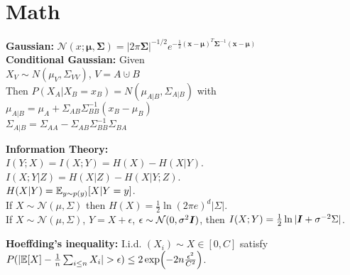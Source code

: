 \section{Math}\vspace*{-0.8em}
\textbf{Gaussian:}
$\mathcal{N}(x;\bm{\mu}, \bm{\Sigma})= |2\pi\bm{\Sigma}|^{-1/2} e^{-\frac{1}{2}(\mathbf{x}-\bm{\mu})^T\bm{\Sigma}^{-1}(\mathbf{x}-\bm{\mu})} $\\
\textbf{Conditional Gaussian:}
Given\\$X_V \sim N(\mu_V, \Sigma_{VV})$, $V=A\cupdot B$\\
Then $P(X_A|X_B=x_B)=N(\mu_{A|B}, \Sigma_{A|B})$ with\\
$\mu_{A|B}=\mu_A+\Sigma_{AB}\Sigma^{-1}_{BB}(x_B-\mu_B)$\\
$\Sigma_{A|B}=\Sigma_{AA}-\Sigma_{AB}\Sigma^{-1}_{BB}\Sigma_{BA}$

\textbf{Information Theory:}\\
$I(Y;X) = I(X;Y) = H(X) - H(X|Y)$.\\
$I(X;Y|Z) = H(X|Z) - H(X|Y;Z)$.\\
$H(X|Y) = \mathbb{E}_{y\sim p(y)}[X|Y=y]$.\\
If $X\sim\mathcal{N}(\mu, \Sigma)$ then $H(X) = \frac{1}{2}\ln(2\pi e)^d|\Sigma|$.\\
If $X\sim\mathcal{N}(\mu, \Sigma)$, $Y = X + \epsilon$, $\epsilon\sim\mathcal{N}(0,\sigma^2{\bm{I}})$, then $I(X;Y) = \frac{1}{2}\ln|{\bm{I}}+\sigma^{-2}\Sigma|$.

\textbf{Hoeffding's inequality:}
I.i.d. $(X_i)\sim X\in[0,C]$ satisfy $P(|\E[X] - \frac{1}{n}\sum_{i\leq n}X_i|>\epsilon) \leq 2\exp(-2n\frac{\epsilon^2}{C^2})$.

